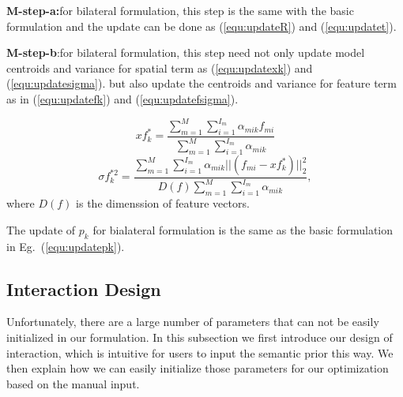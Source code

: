 \textbf{M-step-a:}for bilateral formulation, this step is the same with the basic formulation and the update can be done as (\ref{equ:updateR}) and (\ref{equ:updatet}).

\textbf{M-step-b}:for bilateral formulation, this step need not only update model centroids and variance for spatial term as (\ref{equ:updatexk}) and (\ref{equ:updatesigma}).
but also update the centroids and variance for feature term as in (\ref{equ:updatefk}) and (\ref{equ:updatefsigma}).

\begin{equation}
\label{equ:updatefk}
xf_k^*=\frac{\sum_{m=1}^M\sum_{i=1}^{I_m}\alpha_{mik}f_{mi}}{\sum_{m=1}^M\sum_{i=1}^{I_m}\alpha_{mik}}
\end{equation}
\begin{equation}
\label{equ:updatefsigma}
\sigma f_k^{*2}=\frac{\sum_{m=1}^M\sum_{i=1}^{I_m}\alpha_{mik}||(f_{mi}-xf_k^*)||_2^2}{D(f)\sum_{m=1}^M\sum_{i=1}^{I_m}\alpha_{mik}},
\end{equation}
where $D(f)$ is the dimenssion of feature vectors.



The update of $p_k$ for bialateral  formulation is the same as the basic formulation in Eg.~(\ref{equ:updatepk}).



\subsection{Interaction Design}
\label{sec:imp:interact}
Unfortunately, there are a large number of parameters that can not be easily initialized in our formulation. 
%
In this subsection we first introduce our design of interaction, which is intuitive for users to input the semantic prior this way. We then explain how we can easily initialize those parameters for our optimization based on the manual input.



